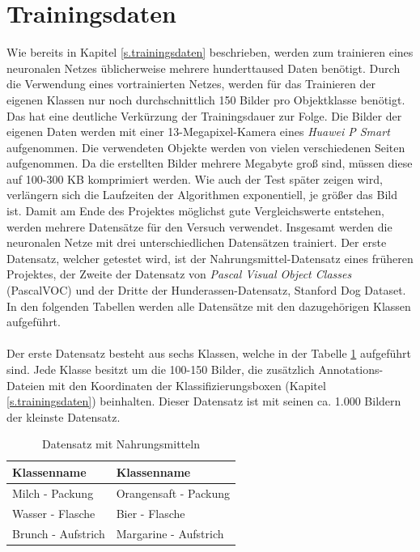   \section{Trainingsdaten}\label{s.tdaten}
Wie bereits in Kapitel \ref{s.trainingsdaten} beschrieben, werden zum trainieren eines neuronalen Netzes üblicherweise mehrere hunderttaused Daten benötigt. Durch die Verwendung eines vortrainierten Netzes, werden für das Trainieren der eigenen Klassen nur noch durchschnittlich 150 Bilder pro Objektklasse benötigt. Das hat eine deutliche Verkürzung der Trainingsdauer zur Folge. Die Bilder der eigenen Daten werden mit einer 13-Megapixel-Kamera eines \textit{Huawei P Smart} aufgenommen. Die verwendeten Objekte werden von vielen verschiedenen Seiten aufgenommen. Da die erstellten Bilder mehrere Megabyte groß sind, müssen diese auf 100-300 KB komprimiert werden. Wie auch der Test später zeigen wird, verlängern sich die Laufzeiten der Algorithmen exponentiell, je größer das Bild ist. Damit am Ende des Projektes möglichst gute Vergleichswerte entstehen, werden mehrere Datensätze für den Versuch verwendet. Insgesamt werden die neuronalen Netze mit drei unterschiedlichen Datensätzen trainiert. Der erste Datensatz, welcher getestet wird, ist der Nahrungsmittel-Datensatz eines früheren Projektes, der Zweite der Datensatz von \textit{Pascal Visual Object Classes} (PascalVOC) und der Dritte der Hunderassen-Datensatz, Stanford Dog Dataset. In den folgenden Tabellen werden alle Datensätze mit den dazugehörigen Klassen aufgeführt.\\\\
Der erste Datensatz besteht aus sechs Klassen, welche in der Tabelle \ref{tab:nahrungsmittel} aufgeführt sind. Jede Klasse besitzt um die 100-150 Bilder, die zusätzlich Annotations-Dateien mit den Koordinaten der Klassifizierungsboxen (Kapitel \ref{s.trainingsdaten}) beinhalten. Dieser Datensatz ist mit seinen ca. 1.000 Bildern der kleinste Datensatz. 
\begin{table}
[h]
\caption{Datensatz mit Nahrungsmitteln}
\centering
\begin{tabular}{|l|l|}
\hline
Klassenname & Klassenname\\
\hline
Milch - Packung & Orangensaft - Packung\\
Wasser - Flasche & Bier - Flasche\\
Brunch - Aufstrich & Margarine - Aufstrich\\
\hline
\end{tabular}
\label{tab:nahrungsmittel}
\end{table}
